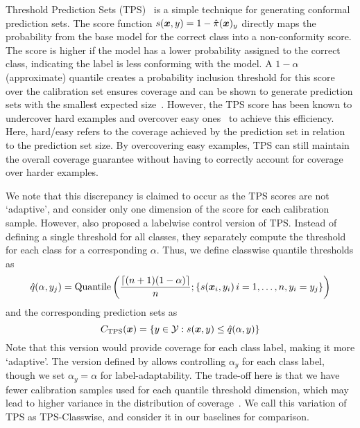 Threshold Prediction Sets (TPS)~\citep{sadinle2019least} is a simple technique for generating conformal prediction sets.
The score function $s({\bm{x}}, y) = 1 - \hat{\pi}({\bm{x}})_y$ directly maps the probability from the base model for the correct class into a non-conformity score.
The score is higher if the model has a lower probability assigned to the correct class, indicating the label is less conforming with the model.
A $1-\alpha$ (approximate) quantile creates a probability inclusion threshold for this score over the calibration set ensures coverage and can be shown to generate prediction sets with the smallest expected size~\cite{sadinle2019least}.
However, the TPS score has been known to undercover hard examples and overcover easy ones~\citep{angelopoulos2021uncertainty,zargarbashi23conformal} to achieve this efficiency.
Here, hard/easy refers to the coverage achieved by the prediction set in relation to the prediction set size.
By overcovering easy examples, TPS can still maintain the overall coverage guarantee without having to correctly account for coverage over harder examples.

We note that this discrepancy is claimed to occur as the TPS scores are not `adaptive', and consider only one dimension of the score for each calibration sample.
However, \citet{sadinle2019least} also proposed a labelwise control version of TPS.
Instead of defining a single threshold for all classes, they separately compute the threshold for each class for a corresponding $\alpha$.
Thus, we define classwise quantile thresholds as
\[
    \hat{q}(\alpha, y_j) = \text{Quantile}\left(\frac{\lceil(n+1)(1-\alpha)\rceil}{n}; \{s({\bm{x}}_i, y_i)\, {i=1, \dots, n, y_i = y_j}\}\right)
\]
and the corresponding prediction sets as
\[
    C_{\text{TPS}}({\bm{x}}) = \{y \in {\mathcal{Y}}: s({\bm{x}}, y) \leq \hat{q}(\alpha, y)\}
\]
Note that this version would provide coverage for each class label, making it more `adaptive'.
The version defined by \citet{sadinle2019least} allows controlling $\alpha_y$ for each class label, though we set $\alpha_y = \alpha$ for label-adaptability.
The trade-off here is that we have fewer calibration samples used for each quantile threshold dimension, which may lead to higher variance in the distribution of coverage~\cite{vovk2012conditional}.
We call this variation of TPS as TPS-Classwise, and consider it in our baselines for comparison.